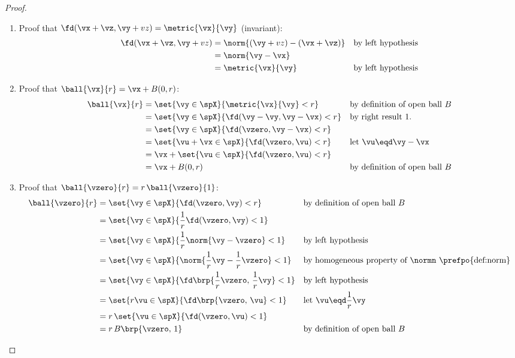 \begin{proof}
\begin{enumerate}
  \item Proof that $\fd(\vx+\vz,\vy+vz) = \metric{\vx}{\vy}$ (invariant):
        \begin{align*}
          \fd(\vx+\vz,\vy+vz)
            &= \norm{(\vy+vz)-(\vx+\vz)}
            && \text{by left hypothesis}
          \\&= \norm{\vy-\vx}
          \\&= \metric{\vx}{\vy}
            && \text{by left hypothesis}
        \end{align*}

  \item Proof that $\ball{\vx}{r} = \vx + B(0,r)$:
        \begin{align*}
          \ball{\vx}{r} 
            &= \set{\vy\in\spX}{\metric{\vx}{\vy}<r}
            && \text{by definition of open ball $B$}
          \\&= \set{\vy\in\spX}{\fd(\vy-\vy,\vy-\vx)<r}
            && \text{by right result 1.}
          \\&= \set{\vy\in\spX}{\fd(\vzero,\vy-\vx)<r}
          \\&= \set{\vu+\vx\in\spX}{\fd(\vzero,\vu)<r}
            && \text{let $\vu\eqd\vy-\vx$}
          \\&= \vx + \set{\vu\in\spX}{\fd(\vzero,\vu)<r}
          \\&= \vx + B(0,r)
            && \text{by definition of open ball $B$}
        \end{align*}

  \item Proof that $\ball{\vzero}{r} = r\,\ball{\vzero}{1}$:
        \begin{align*}
          \ball{\vzero}{r} 
            &= \set{\vy\in\spX}{\fd(\vzero,\vy)<r}
            && \text{by definition of open ball $B$}
          \\&= \set{\vy\in\spX}{\frac{1}{r}\fd(\vzero,\vy)<1}
          \\&= \set{\vy\in\spX}{\frac{1}{r}\norm{\vy-\vzero}<1}
            && \text{by left hypothesis}
          \\&= \set{\vy\in\spX}{\norm{\frac{1}{r}\vy-\frac{1}{r}\vzero}<1}
            && \text{by homogeneous property of $\normn$ \prefpo{def:norm}}
          \\&= \set{\vy\in\spX}{\fd\brp{\frac{1}{r}\vzero,\, \frac{1}{r}\vy}<1}
            && \text{by left hypothesis}
          \\&= \set{r\vu\in\spX}{\fd\brp{\vzero,\,\vu}<1}
            && \text{let $\vu\eqd\frac{1}{r}{\vy}$}
          \\&= r\, \set{\vu\in\spX}{\fd(\vzero,\vu)<1}
          \\&= r\, B\brp{\vzero,\, 1}
            && \text{by definition of open ball $B$}
        \end{align*}


\end{enumerate}
\end{proof}
